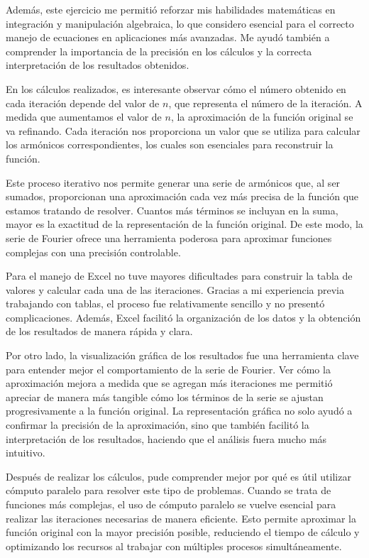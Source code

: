 {Además, este ejercicio me permitió reforzar mis habilidades matemáticas en integración y manipulación algebraica, lo que considero esencial para el correcto manejo de ecuaciones en aplicaciones más avanzadas. Me ayudó también a comprender la importancia de la precisión en los cálculos y la correcta interpretación de los resultados obtenidos.

En los cálculos realizados, es interesante observar cómo el número obtenido en cada iteración depende del valor de \(n\), que representa el número de la iteración. A medida que aumentamos el valor de \(n\), la aproximación de la función original se va refinando. Cada iteración nos proporciona un valor que se utiliza para calcular los armónicos correspondientes, los cuales son esenciales para reconstruir la función.

Este proceso iterativo nos permite generar una serie de armónicos que, al ser sumados, proporcionan una aproximación cada vez más precisa de la función que estamos tratando de resolver. Cuantos más términos se incluyan en la suma, mayor es la exactitud de la representación de la función original. De este modo, la serie de Fourier ofrece una herramienta poderosa para aproximar funciones complejas con una precisión controlable.

Para el manejo de Excel no tuve mayores dificultades para construir la tabla de valores y calcular cada una de las iteraciones. Gracias a mi experiencia previa trabajando con tablas, el proceso fue relativamente sencillo y no presentó complicaciones. Además, Excel facilitó la organización de los datos y la obtención de los resultados de manera rápida y clara.

Por otro lado, la visualización gráfica de los resultados fue una herramienta clave para entender mejor el comportamiento de la serie de Fourier. Ver cómo la aproximación mejora a medida que se agregan más iteraciones me permitió apreciar de manera más tangible cómo los términos de la serie se ajustan progresivamente a la función original. La representación gráfica no solo ayudó a confirmar la precisión de la aproximación, sino que también facilitó la interpretación de los resultados, haciendo que el análisis fuera mucho más intuitivo.

Después de realizar los cálculos, pude comprender mejor por qué es útil utilizar cómputo paralelo para resolver este tipo de problemas. Cuando se trata de funciones más complejas, el uso de cómputo paralelo se vuelve esencial para realizar las iteraciones necesarias de manera eficiente. Esto permite aproximar la función original con la mayor precisión posible, reduciendo el tiempo de cálculo y optimizando los recursos al trabajar con múltiples procesos simultáneamente.

}
